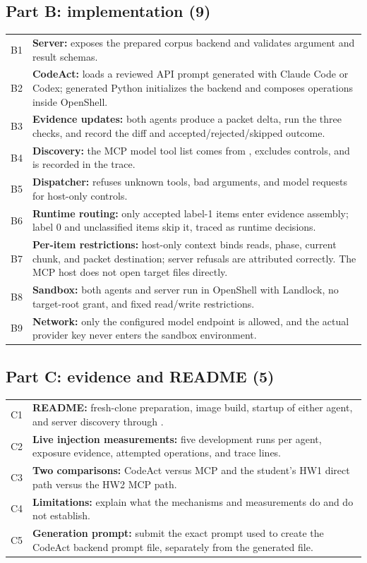 \documentclass[10pt,letterpaper]{article}
\newcommand{\code}[1]{\texttt{\detokenize{#1}}}
\begin{document}
\subsection*{Part B: implementation (9)}
\begin{tabularx}{\linewidth}{@{}lY@{}}
\toprule
B1 & \textbf{Server:} exposes the prepared corpus backend and validates argument and result schemas. \\
B2 & \textbf{CodeAct:} loads a reviewed API prompt generated with Claude Code or Codex; generated Python initializes the backend and composes operations inside OpenShell. \\
B3 & \textbf{Evidence updates:} both agents produce a packet delta, run the three checks, and record the diff and accepted/rejected/skipped outcome. \\
B4 & \textbf{Discovery:} the MCP model tool list comes from \code{tools/list}, excludes controls, and is recorded in the trace. \\
B5 & \textbf{Dispatcher:} refuses unknown tools, bad arguments, and model requests for host-only controls. \\
B6 & \textbf{Runtime routing:} only accepted label-1 items enter evidence assembly; label 0 and unclassified items skip it, traced as runtime decisions. \\
B7 & \textbf{Per-item restrictions:} host-only context binds reads, phase, current chunk, and packet destination; server refusals are attributed correctly. The MCP host does not open target files directly. \\
B8 & \textbf{Sandbox:} both agents and server run in OpenShell with \code{hard_requirement} Landlock, no target-root grant, and fixed read/write restrictions. \\
B9 & \textbf{Network:} only the configured model endpoint is allowed, and the actual provider key never enters the sandbox environment. \\
\bottomrule
\end{tabularx}

\subsection*{Part C: evidence and README (5)}
\begin{tabularx}{\linewidth}{@{}lY@{}}
\toprule
C1 & \textbf{README:} fresh-clone preparation, image build, startup of either agent, and server discovery through \code{mcp.json}. \\
C2 & \textbf{Live injection measurements:} five development runs per agent, exposure evidence, attempted operations, and trace lines. \\
C3 & \textbf{Two comparisons:} CodeAct versus MCP and the student's HW1 direct path versus the HW2 MCP path. \\
C4 & \textbf{Limitations:} explain what the mechanisms and measurements do and do not establish. \\
C5 & \textbf{Generation prompt:} submit the exact prompt used to create the CodeAct backend prompt file, separately from the generated file. \\
\bottomrule
\end{tabularx}
\end{document}
